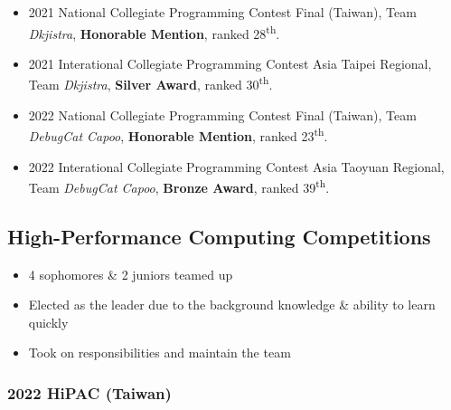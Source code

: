 \documentclass[12pt, a4paper]{article}
\begin{document}
\begin{itemize}
\item 2021 National Collegiate Programming Contest Final (Taiwan), Team \emph{Dkjistra}, \textbf{Honorable Mention}, ranked 28\textsuperscript{th}.
\item 2021 Interational Collegiate Programming Contest Asia Taipei Regional, Team \emph{Dkjistra}, \textbf{Silver Award}, ranked 30\textsuperscript{th}.
\item 2022 National Collegiate Programming Contest Final (Taiwan), Team \emph{DebugCat Capoo}, \textbf{Honorable Mention}, ranked 23\textsuperscript{th}.
\item 2022 Interational Collegiate Programming Contest Asia Taoyuan Regional, Team \emph{DebugCat Capoo}, \textbf{Bronze Award}, ranked 39\textsuperscript{th}.
\end{itemize}

\subsection{High-Performance Computing Competitions}


\begin{itemize}
\item 4 sophomores \& 2 juniors teamed up
\item Elected as the leader due to the background knowledge \& ability to learn quickly
\item Took on responsibilities and maintain the team
\end{itemize}

\subsubsection{2022 HiPAC (Taiwan)}

\end{document}
